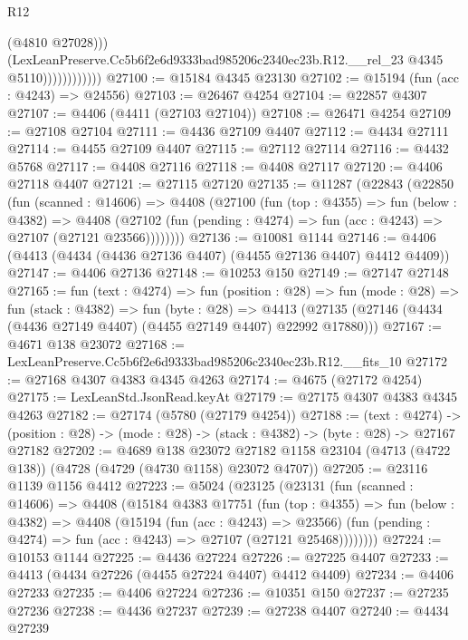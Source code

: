 \begin{lexlean}{R12}
\begin{coremodule}
                              (@4810 @27028)))
                          (LexLeanPreserve.Cc5b6f2e6d9333bad985206c2340ec23b.R12.__rel_23
                            @4345
                            @5110))))))))))))
@27100 := @15184 @4345 @23130
@27102 := @15194 (fun (acc : @4243) => @24556)
@27103 := @26467 @4254
@27104 := @22857 @4307
@27107 := @4406 (@4411 (@27103 @27104))
@27108 := @26471 @4254
@27109 := @27108 @27104
@27111 := @4436 @27109 @4407
@27112 := @4434 @27111
@27114 := @4455 @27109 @4407
@27115 := @27112 @27114
@27116 := @4432 @5768
@27117 := @4408 @27116
@27118 := @4408 @27117
@27120 := @4406 @27118 @4407
@27121 := @27115 @27120
@27135 := @11287
    (@22843
      (@22850
        (fun (scanned : @14606) =>
        @4408
          (@27100
            (fun (top : @4355) =>
            fun (below : @4382) =>
            @4408
              (@27102 (fun (pending : @4274) => fun (acc : @4243) => @27107 (@27121 @23566))))))))
@27136 := @10081 @1144
@27146 := @4406 (@4413 (@4434 (@4436 @27136 @4407) (@4455 @27136 @4407) @4412 @4409))
@27147 := @4406 @27136
@27148 := @10253 @150
@27149 := @27147 @27148
@27165 := fun (text : @4274) =>
  fun (position : @28) =>
  fun (mode : @28) =>
  fun (stack : @4382) =>
  fun (byte : @28) =>
  @4413 (@27135 (@27146 (@4434 (@4436 @27149 @4407) (@4455 @27149 @4407) @22992 @17880)))
@27167 := @4671 @138 @23072
@27168 := LexLeanPreserve.Cc5b6f2e6d9333bad985206c2340ec23b.R12.__fits_10
@27172 := @27168 @4307 @4383 @4345 @4263
@27174 := @4675 (@27172 @4254)
@27175 := LexLeanStd.JsonRead.keyAt
@27179 := @27175 @4307 @4383 @4345 @4263
@27182 := @27174 (@5780 (@27179 @4254))
@27188 := (text : @4274) ->
  (position : @28) -> (mode : @28) -> (stack : @4382) -> (byte : @28) -> @27167 @27182
@27202 := @4689
    @138
    @23072
    @27182
    @1158
    @23104
    (@4713 (@4722 @138))
    (@4728 (@4729 (@4730 @1158) @23072 @4707))
@27205 := @23116 @1139 @1156 @4412
@27223 := @5024
    (@23125
      (@23131
        (fun (scanned : @14606) =>
        @4408
          (@15184
            @4383
            @17751
            (fun (top : @4355) =>
            fun (below : @4382) =>
            @4408
              (@15194
                (fun (acc : @4243) => @23566)
                (fun (pending : @4274) => fun (acc : @4243) => @27107 (@27121 @25468))))))))
@27224 := @10153 @1144
@27225 := @4436 @27224
@27226 := @27225 @4407
@27233 := @4413 (@4434 @27226 (@4455 @27224 @4407) @4412 @4409)
@27234 := @4406 @27233
@27235 := @4406 @27224
@27236 := @10351 @150
@27237 := @27235 @27236
@27238 := @4436 @27237
@27239 := @27238 @4407
@27240 := @4434 @27239

\end{coremodule}
\end{lexlean}
